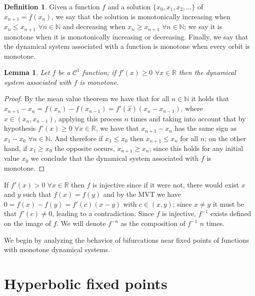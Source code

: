 \documentclass[12pt,a4paper]{report}
\newtheorem{lema}{Lemma}[section]
\theoremstyle{definition}
\newtheorem{definicion}{Definition}[section]
\begin{document}
\begin{definicion}
Given a function $f$ and a solution $\{x_0,x_1,x_2 , \ldots\} $ of $x_{n+1} = f(x_n)$, we say that the solution is monotonically increasing when $x_n \leq x_{n+1}$ $\forall n \in \mathbb{N}$ and decreasing when $x_n \geq x_{n+1}$ $\forall n \in \mathbb{N}$; we say it is monotone when it is monotonically increasing or decreasing. Finally, we say that the dynamical system associated with a function is monotone when every orbit is monotone. 
\end{definicion}

\begin{lema}

Let $f$ be a $\mathcal{C}^1$ function; if $f'(x) \geq 0$ $\forall x \in \mathbb{R}$ then the dynamical system associated with $f$ is monotone.
    
\end{lema}

\begin{proof}

By the mean value theorem we have that for all $n \in \mathbb{N}$ it holds that $x_{n+1} - x_n = f(x_n) - f(x_{n-1}) = f'(\hat{x}) (x_{n} - x_{n-1})$, where $\hat{x} \in (x_{n}, x_{n-1})$,
applying this process $n$ times and taking into account that by hypothesis $f'(x) \geq 0$ $\forall x \in \mathbb{R}$, we have that $x_{n+1} - x_{n}$ has the same sign as $x_{1} - x_{0}$ $\forall n \in \mathbb{N}$. And therefore if $x_1 \leq x_0$ then $x_{n+1} \leq x_n$ for all $n$; on the other hand, if $x_1 \geq x_0$ the opposite occurs, $x_{n+1} \geq x_n$; since this holds for any initial value $x_0$ we conclude that the dynamical system associated with $f$ is monotone.

\end{proof}

If $f'(x) > 0$ $\forall x \in \mathbb{R}$ then $f$ is injective since if it were not, there would exist $x$ and $y$ such that $f(x) = f(y)$ and by the MVT we have $0 = f(x) - f(y) = f'(c) (x - y)$ with $c \in (x,y)$; since $x \neq y$ it must be that $f'(c) \neq 0$, leading to a contradiction.
Since $f$ is injective, $f^{-1}$ exists defined on the image of $f$. We will denote $f^{-n}$ as the composition of $f^{-1}$ $n$ times.

We begin by analyzing the behavior of bifurcations near fixed points of functions with monotone dynamical systems.

\section{Hyperbolic fixed points}
\end{document}

